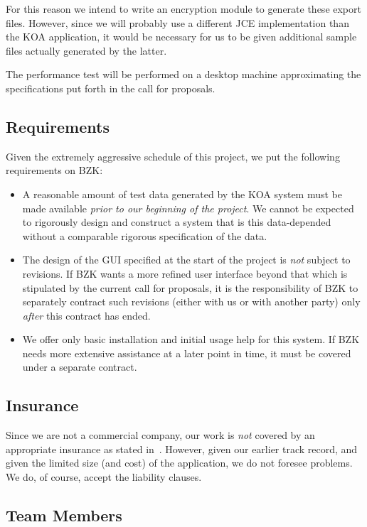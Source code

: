 \documentclass{article}
\begin{document}
For this reason we intend to write an encryption module to generate
these export files.  However, since we will probably use a different
JCE implementation than the KOA application, it would be necessary for
us to be given additional sample files actually generated by the
latter.

The performance test will be performed on a desktop machine
approximating the specifications put forth in the call for proposals.

\subsection{Requirements}

Given the extremely aggressive schedule of this project, we put the
following requirements on BZK:
\begin{itemize}
\item A reasonable amount of test data generated by the KOA system
  must be made available \emph{prior to our beginning of the project}.
  We cannot be expected to rigorously design and construct a system
  that is this data-depended without a comparable rigorous
  specification of the data.
\item The design of the GUI specified at the start of the project is
  \emph{not} subject to revisions.  If BZK wants a more refined
  user interface beyond that which is stipulated by the current call
  for proposals, it is the responsibility of BZK to separately
  contract such revisions (either with us or with another party) only
  \emph{after} this contract has ended.
\item We offer only basic installation and initial usage help for this
  system.  If BZK needs more extensive assistance at a later point in
  time, it must be covered under a separate contract.
\end{itemize}

\subsection{Insurance}

Since we are not a commercial company, our work is {\em not} covered
by an appropriate insurance as stated in~\cite[article 25]{AVODIBZK}.
However, given our earlier track record, and given the limited size
(and cost) of the application, we do not foresee problems.  We do, of
course, accept the liability clauses.

\subsection{Team Members}
\end{document}
